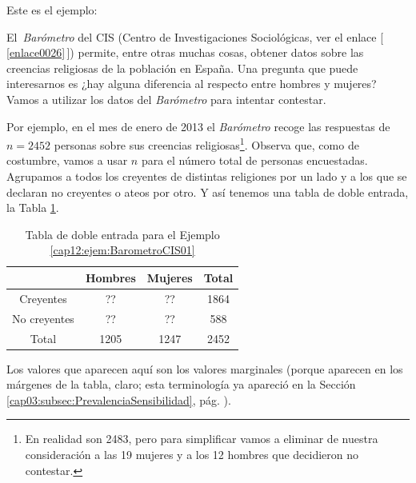 \noindent Este es el ejemplo:
\begin{ejemplo}
\label{cap12:ejem:BarometroCIS01}
El\, {\em Barómetro} del CIS (Centro de Investigaciones
Sociológicas, ver el enlace [\,\ref{enlace0026}\,]\label{enlace0026a}) permite,
entre otras muchas cosas, obtener datos sobre las creencias religiosas de la población en España.
Una pregunta que puede interesarnos es ¿hay alguna diferencia al respecto entre hombres y mujeres?
Vamos a utilizar los datos del {\em Barómetro} para intentar contestar.

Por ejemplo, en el mes de enero de 2013 el {\em Barómetro} recoge las respuestas de $n=2452$ personas sobre sus creencias religiosas\footnote{En realidad son 2483, pero para simplificar vamos a eliminar de nuestra consideración a las 19 mujeres y a los 12 hombres que decidieron no contestar.}. Observa que, como de costumbre, vamos a usar $n$ para el número total de personas encuestadas. Agrupamos a todos los creyentes de distintas religiones por un lado y a los que se declaran no creyentes o ateos por otro. Y así tenemos una tabla de doble entrada, la Tabla \ref{cap12:tabla:marginalesEjemploBarometroCis}.
\begin{table}[ht]
        \begin{center}
        \begin{tabular}{|c|c|c|c|}
          \hline
           & Hombres & Mujeres & Total \\
           \hline
          Creyentes & ?? & ?? & 1864 \\
          \hline
          No creyentes & ?? & ?? & 588 \\
          \hline
          Total & 1205 & 1247 & 2452 \\
          \hline
        \end{tabular}
        \end{center}
\caption{Tabla de doble entrada para el Ejemplo \ref{cap12:ejem:BarometroCIS01}}
\label{cap12:tabla:marginalesEjemploBarometroCis}
\end{table}
Los valores que aparecen aquí son los {\sf valores marginales} (porque aparecen en los márgenes de la tabla, claro; esta terminología ya apareció en la Sección \ref{cap03:subsec:PrevalenciaSensibilidad}, pág. \pageref{cap03:subsec:PrevalenciaSensibilidad}).


\end{ejemplo}
